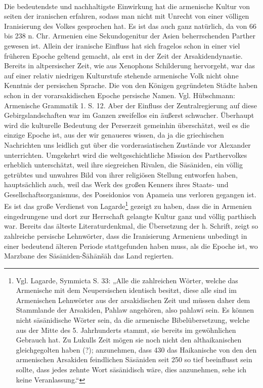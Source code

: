 \documentclass{article}
\begin{document}
\paragraph{}
Die bedeutendste und nachhaltigste Einwirkung hat die armenische Kultur von seiten der iranischen erfahren, sodass man nicht mit Unrecht von einer völligen Iranisierung des Volkes gesprochen hat. Es ist das auch ganz natürlich, da von 66 bis 238 n. Chr. Armenien eine Sekundogenitur der Asien beherrschenden Parther gewesen ist. Allein der iranische Einfluss hat sich fragelos schon in einer viel früheren Epoche geltend gemacht, als erst in der Zeit der Arsakidendynastie. Bereits in altpersischer Zeit, wie aus Xenophons Schilderung hervorgeht, war das auf einer relativ niedrigen Kulturstufe stehende armenische Volk nicht ohne Kenntnis der persischen Sprache. Die von den Königen gegründeten Städte haben schon in der vorarsakidischen Epoche persische Namen. Vgl. Hübschmann: Armenische Grammatik 1. S. 12. Aber der Einfluss der Zentralregierung auf diese Gebirgslandschaften war im Ganzen zweifellos ein äußerst schwacher. Überhaupt wird die kulturelle Bedeutung der Perserzeit gemeinhin überschätzt, weil es die einzige Epoche ist, aus der wir genaueres wissen, da ja die griechischen Nachrichten uns leidlich gut über die vorderasiatischen Zustände vor Alexander unterrichten. Umgekehrt wird die weltgeschichtliche Mission des Parthervolkes erheblich unterschätzt, weil ihre siegreichen Rivalen, die Sāsāniden, ein völlig getrübtes und unwahres Bild von ihrer religiösen Stellung entworfen haben, hauptsächlich auch, weil das Werk des großen Kenners ihres Staats- und Gesellschaftsorganismus, des Poseidonios von Apameia uns verloren gegangen ist. Es ist das große Verdienst von Lagarde\footnote{Vgl. Lagarde, Symmicta S. 33: „Alle die zahlreichen Wörter, welche das Armenische mit dem Neupersischen identisch besitzt, diese alle sind im Armenischen Lehnwörter aus der arsakidischen Zeit und müssen daher dem Stammlande der Arsakiden, Pahlaw angehören, also pahlawī sein. Es können nicht sāsānidische Wörter sein, da die armenische Bibelübersetzung, welche aus der Mitte des 5. Jahrhunderts stammt, sie bereits im gewöhnlichen Gebrauch hat. Zu Lukulls Zeit mögen sie noch nicht den althaikanischen gleichgegolten haben (?); anzunehmen, dass 430 das Haikanische von den den armenischen Arsakiden feindlichen Sāsāniden seit 250 so tief beeinflusst sein sollte, dass jedes zehnte Wort sāsānidisch wäre, dies anzunehmen, sehe ich keine Veranlassung.“} gezeigt zu haben, dass die in Armenien eingedrungene und dort zur Herrschaft gelangte Kultur ganz und völlig parthisch war. Bereits das älteste Literaturdenkmal, die Übersetzung der h. Schrift, zeigt so zahlreiche persische Lehnwörter, dass die Iranisierung Armeniens unbedingt in einer bedeutend älteren Periode stattgefunden haben muss, als die Epoche ist, wo Marzbane des Sāsāniden-Šāhānšāh das Land regierten.
\end{document}
